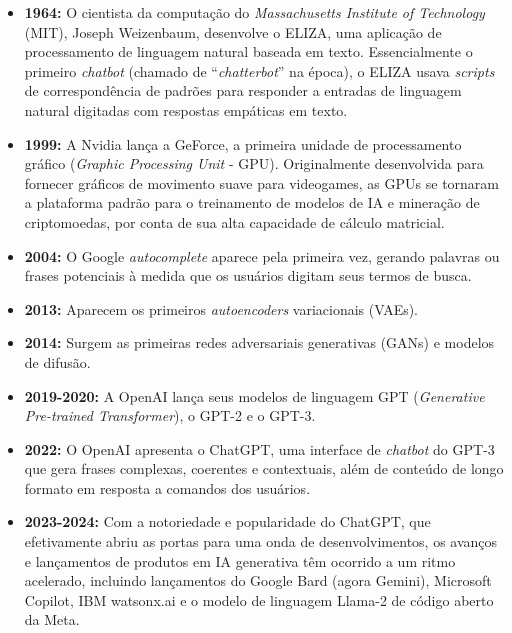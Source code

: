 \documentclass[a4paper, 12pt]{article}
\newcommand{\citeb}[1]{\bibleftbracket\cite{#1}\bibrightbracket}
\begin{document}
    \begin{itemize}
        \item \textbf{1964:} O cientista da computação do \textit{Massachusetts Institute of Technology} (MIT), Joseph Weizenbaum, desenvolve o ELIZA, uma aplicação de processamento de linguagem natural baseada em texto. Essencialmente o primeiro \textit{chatbot} (chamado de ``\textit{chatterbot}'' na época), o ELIZA usava \textit{scripts} de correspondência de padrões para responder a entradas de linguagem natural digitadas com respostas empáticas em texto.

        \item \textbf{1999:} A Nvidia lança a GeForce, a primeira unidade de processamento gráfico (\textit{Graphic Processing Unit} - GPU). Originalmente desenvolvida para fornecer gráficos de movimento suave para videogames, as GPUs se tornaram a plataforma padrão para o treinamento de modelos de IA e mineração de criptomoedas, por conta de sua alta capacidade de cálculo matricial.

        \item \textbf{2004:} O Google \textit{autocomplete} aparece pela primeira vez, gerando palavras ou frases potenciais à medida que os usuários digitam seus termos de busca.

        \item \textbf{2013:} Aparecem os primeiros \textit{autoencoders} variacionais (VAEs).

        \item \textbf{2014:} Surgem as primeiras redes adversariais generativas (GANs) e modelos de difusão.


        \item \textbf{2019-2020:} A OpenAI lança seus modelos de linguagem GPT (\textit{Generative Pre-trained Transformer}), o GPT-2 e o GPT-3.

        \item \textbf{2022:} O OpenAI apresenta o ChatGPT, uma interface de \textit{chatbot} do GPT-3 que gera frases complexas, coerentes e contextuais, além de conteúdo de longo formato em resposta a comandos dos usuários.
        
        \item \textbf{2023-2024:} Com a notoriedade e popularidade do ChatGPT, que efetivamente abriu as portas para uma onda de desenvolvimentos, os avanços e lançamentos de produtos em IA generativa têm ocorrido a um ritmo acelerado, incluindo lançamentos do Google Bard (agora Gemini), Microsoft Copilot, IBM watsonx.ai e o modelo de linguagem Llama-2 de código aberto da Meta.
    \end{itemize}
\end{document}
